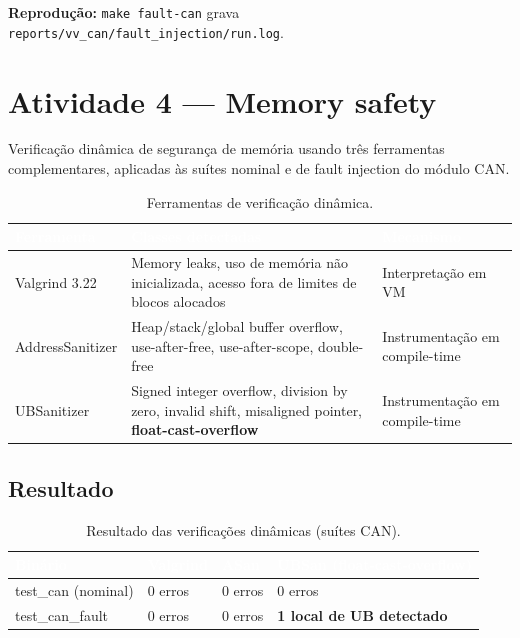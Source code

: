 \documentclass[12pt]{article}
\begin{document}
\textbf{Reprodução:} \texttt{make fault-can} grava \texttt{reports/vv\_can/fault\_injection/run.log}.

\section{Atividade 4 --- Memory safety}
\label{sec:memory}

Verificação dinâmica de segurança de memória usando três ferramentas complementares, aplicadas às
suítes nominal e de fault injection do módulo CAN.

\begin{table}[H]
\centering
\caption{Ferramentas de verificação dinâmica.}
\footnotesize
\begin{tabularx}{\textwidth}{|>{\raggedright\arraybackslash}p{2.6cm}
                              |>{\raggedright\arraybackslash}X
                              |>{\raggedright\arraybackslash}p{3.0cm}|}
\hline
\rowcolor{sectionblue}
\textcolor{white}{\textbf{Ferramenta}} &
\textcolor{white}{\textbf{Classes detectadas}} &
\textcolor{white}{\textbf{Mecanismo}} \\ \hline
Valgrind 3.22    & Memory leaks, uso de memória não inicializada, acesso fora de limites de blocos alocados & Interpretação em VM \\ \hline
AddressSanitizer & Heap/stack/global buffer overflow, use-after-free, use-after-scope, double-free         & Instrumentação em compile-time \\ \hline
UBSanitizer      & Signed integer overflow, division by zero, invalid shift, misaligned pointer, \textbf{float-cast-overflow} & Instrumentação em compile-time \\ \hline
\end{tabularx}
\end{table}

\subsection{Resultado}

\begin{table}[H]
\centering
\caption{Resultado das verificações dinâmicas (suítes CAN).}
\footnotesize
\begin{tabular}{|l|l|l|l|}
\hline
\rowcolor{sectionblue}
\textcolor{white}{\textbf{Binário}} &
\textcolor{white}{\textbf{Valgrind}} &
\textcolor{white}{\textbf{ASan}} &
\textcolor{white}{\textbf{UBSan (float-cast-overflow)}} \\ \hline
test\_can (nominal)       & 0 erros & 0 erros & 0 erros \\ \hline
test\_can\_fault          & 0 erros & 0 erros & \textbf{1 local de UB detectado} \\ \hline
\end{tabular}
\end{table}
\end{document}
